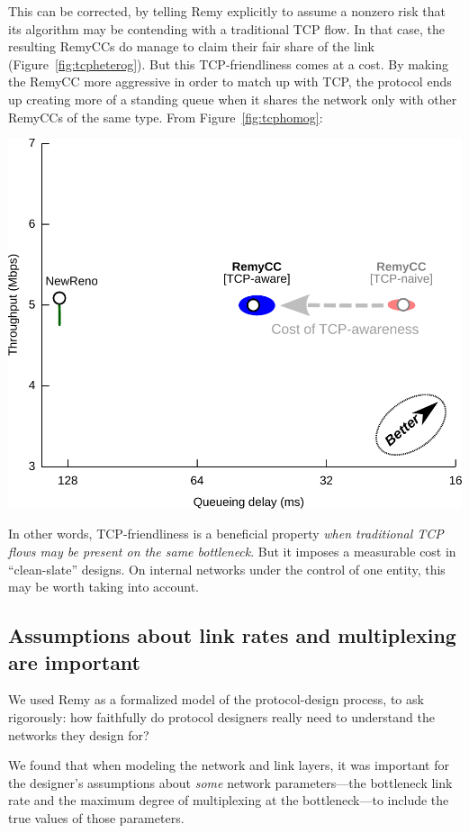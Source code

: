 This can be corrected, by telling Remy explicitly to assume a nonzero
risk that its algorithm may be contending with a traditional TCP
flow. In that case, the resulting RemyCCs do manage to claim their
fair share of the link (Figure~\ref{fig:tcpheterog}). But this
TCP-friendliness comes at a cost. By making the RemyCC more aggressive
in order to match up with TCP, the protocol ends up creating more
of a standing queue when it shares the network only
with other RemyCCs of the same type. From Figure~\ref{fig:tcphomog}:

\begin{center}
\includegraphics[width=0.95 \textwidth]{homo-3.pdf}
\end{center}

In other words, TCP-friendliness is a beneficial property \emph{when
  traditional TCP flows may be present on the same bottleneck}. But it
imposes a measurable cost in ``clean-slate'' designs. On internal networks
under the control of one entity, this may be worth taking into account.

\subsection{Assumptions about link rates and multiplexing are important}

We used Remy as a formalized model of the protocol-design process, to
ask rigorously: how faithfully do protocol designers really need to
understand the networks they design for?

We found that when modeling the network and link layers, it was
important for the designer's assumptions about \emph{some} network
parameters---the bottleneck link rate and the maximum degree of
multiplexing at the bottleneck---to include the true values of those
parameters.

